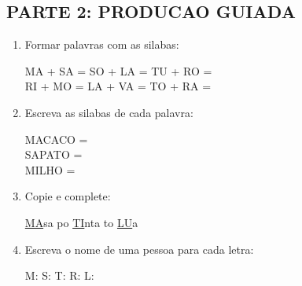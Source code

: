 \begin{exercicio}
\subsection*{PARTE 2: PRODUCAO GUIADA}

\begin{enumerate}[resume]
  \item Formar palavras com as silabas:
  \begin{center}
  MA + SA = \underline{\hspace{2cm}} \quad SO + LA = \underline{\hspace{2cm}} \quad TU + RO = \underline{\hspace{2cm}}\\[0.5em]
  RI + MO = \underline{\hspace{2cm}} \quad LA + VA = \underline{\hspace{2cm}} \quad TO + RA = \underline{\hspace{2cm}}
  \end{center}

  \item Escreva as silabas de cada palavra:
  \begin{center}
  MACACO = \underline{\hspace{1cm}} \underline{\hspace{1cm}} \underline{\hspace{1cm}}\\
  SAPATO = \underline{\hspace{1cm}} \underline{\hspace{1cm}} \underline{\hspace{1cm}}\\
  MILHO = \underline{\hspace{1cm}} \underline{\hspace{1cm}}
  \end{center}

  \item Copie e complete:
  \begin{center}
  \underline{MA}sa \quad {}po \quad \underline{TI}nta \quad {}to \quad \underline{LU}a
  \end{center}

  \item Escreva o nome de uma pessoa para cada letra:
  \begin{center}
  M: \underline{\hspace{3cm}} \quad S: \underline{\hspace{3cm}} \quad T: \underline{\hspace{3cm}} \quad R: \underline{\hspace{3cm}} \quad L: \underline{\hspace{3cm}}
  \end{center}


\end{enumerate}
\end{exercicio}
